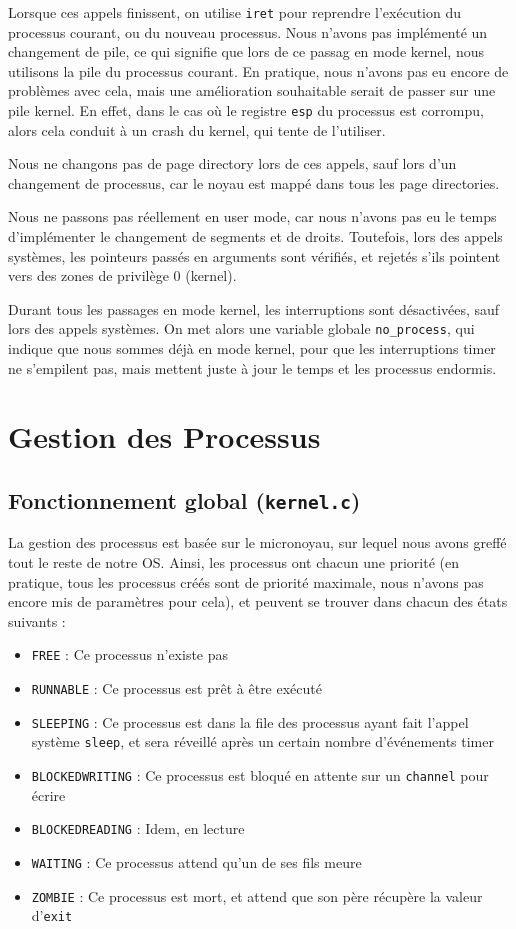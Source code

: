 \documentclass[a4paper,10pt, french]{article}
\newcommand{\code}[1]{\texttt{#1}}
\begin{document}
Lorsque ces appels finissent, on utilise \code{iret} pour reprendre l'exécution du processus courant, ou 
du nouveau processus.
Nous n'avons pas implémenté un changement de pile, ce qui signifie que lors de ce passag en mode kernel,
nous utilisons la pile du processus courant. En pratique, nous n'avons pas eu encore de problèmes avec cela, 
mais une amélioration souhaitable serait de passer sur une pile kernel. En effet, dans le cas où le registre \code{esp}
du processus est corrompu, alors cela conduit à un crash du kernel, qui tente de l'utiliser.

Nous ne changons pas de page directory lors de ces appels, sauf lors d'un changement de processus, car le
noyau est mappé dans tous les page directories.

Nous ne passons pas réellement en user mode, car nous n'avons pas eu le temps d'implémenter le
changement de segments et de droits. Toutefois, lors des appels systèmes, les pointeurs passés en arguments sont vérifiés,
et rejetés s'ils pointent vers des zones de privilège 0 (kernel).

Durant tous les passages en mode kernel, les interruptions sont désactivées, sauf lors des appels systèmes.
On met alors une variable globale \code{no\_process}, qui indique que nous sommes déjà en mode kernel, pour que les interruptions timer ne 
s'empilent pas, mais mettent juste à jour le temps et les processus endormis.

\section{Gestion des Processus}
\subsection{Fonctionnement global (\code{kernel.c})}
La gestion des processus est basée sur le micronoyau, sur lequel nous avons greffé tout le reste de notre OS.
Ainsi, les processus ont chacun une priorité (en pratique, tous les processus créés sont de priorité maximale, nous
n'avons pas encore mis de paramètres pour cela), et peuvent se trouver dans chacun des états suivants :
\begin{itemize}
 \item \code{FREE} : Ce processus n'existe pas
 \item \code{RUNNABLE} : Ce processus est prêt à être exécuté
 \item \code{SLEEPING} : Ce processus est dans la file des processus ayant fait l'appel système \code{sleep}, et sera 
 réveillé après un certain nombre d'événements timer
 \item \code{BLOCKEDWRITING} : Ce processus est bloqué en attente sur un \code{channel} pour écrire
 \item \code{BLOCKEDREADING} : Idem, en lecture
 \item \code{WAITING} : Ce processus attend qu'un de ses fils meure
 \item \code{ZOMBIE} : Ce processus est mort, et attend que son père récupère la valeur d'\code{exit}
\end{itemize}
\end{document}
